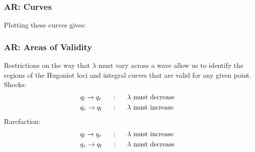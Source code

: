 \documentclass{beamer}
\begin{document}
\begin{frame}
\frametitle{AR: Curves}
Plotting these curves gives:
\begin{figure}[h!]
     \label{fig:AR_curves}
\end{figure}

\end{frame}

\begin{frame}
\frametitle{AR: Areas of Validity}
Restrictions on the way that $\lambda$ must vary across a wave allow us to identify the regions of the Hugoniot loci and integral curves that are valid for any given point. \\
\vspace{0.1in}
Shocks:
\begin{align*}
q_l \rightarrow q_r \hspace{0.2in}&: \hspace{0.2in} \lambda \textnormal{ must decrease}\\
q_r \rightarrow q_l \hspace{0.2in}&: \hspace{0.2in} \lambda \textnormal{ must increase}
\end{align*}
Rarefaction:
\begin{align*}
q_l \rightarrow q_r \hspace{0.2in}&: \hspace{0.2in} \lambda \textnormal{ must increase}\\
q_r \rightarrow q_l \hspace{0.2in}&: \hspace{0.2in} \lambda \textnormal{ must decrease}
\end{align*}
\end{frame}
\end{document}
